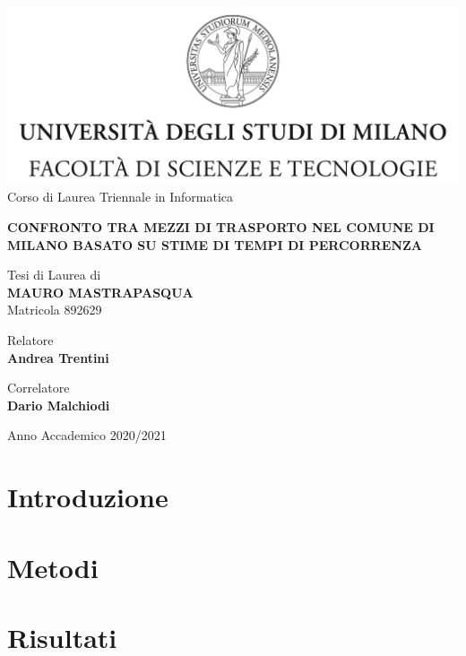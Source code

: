 \documentclass[12pt]{report}
\begin{document}
\begin{titlepage}
	\begin{center}
		\includegraphics[width=\textwidth]{Logo.jpg}
		\large{Corso di Laurea Triennale in Informatica}
		
		\vspace{1.4cm}
		
		\Large{\textbf{CONFRONTO TRA MEZZI DI TRASPORTO NEL COMUNE DI MILANO BASATO SU STIME DI TEMPI DI PERCORRENZA}}
		
		\vspace{0.8cm}
		
		\large{Tesi di Laurea di} \\
		\large{\textbf{MAURO MASTRAPASQUA}} \\
		\large{Matricola 892629}
	\end{center}

	\begin{flushleft}
		\vspace{1.4cm}
		
		\normalsize{Relatore} \\
		\normalsize{\textbf{Andrea Trentini}}

		\vspace{0.4cm}

		\normalsize{Correlatore} \\
		\normalsize{\textbf{Dario Malchiodi}}
	\end{flushleft}

	\begin{center}
		\vspace{0.8cm}
		
		\large{Anno Accademico 2020/2021}
	\end{center}
\end{titlepage}

\tableofcontents
\listoftodos

\chapter{Introduzione}


\chapter{Metodi}


\chapter{Risultati}




\end{document}
